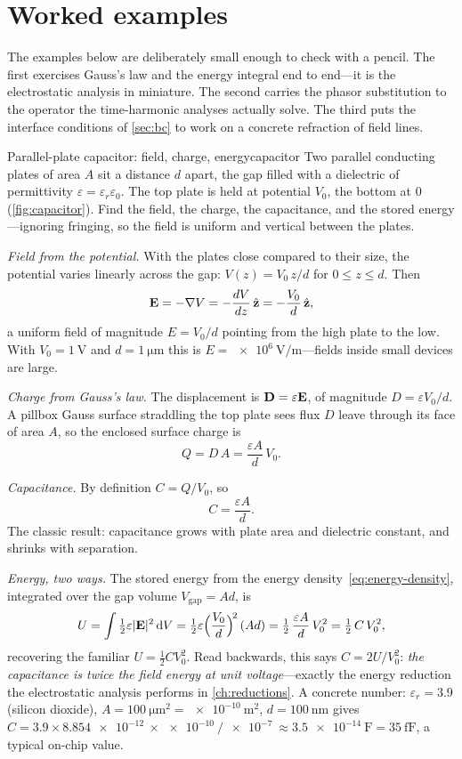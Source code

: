 \section{Worked examples}

The examples below are deliberately small enough to check with a pencil. The
first exercises Gauss's law and the energy integral end to end---it is the
electrostatic analysis in miniature. The second carries the phasor substitution
to the operator the time-harmonic analyses actually solve. The third puts the
interface conditions of \cref{sec:bc} to work on a concrete refraction of field
lines.

\begin{workedexample}{Parallel-plate capacitor: field, charge, energy}{capacitor}
Two parallel conducting plates of area $A$ sit a distance $d$ apart, the gap
filled with a dielectric of permittivity $\varepsilon=\varepsilon_r\varepsilon_0$.
The top plate is held at potential $V_0$, the bottom at $0$ (\cref{fig:capacitor}).
Find the field, the charge, the capacitance, and the stored energy---ignoring
fringing, so the field is uniform and vertical between the plates.

\emph{Field from the potential.} With the plates close compared to their size,
the potential varies linearly across the gap: $V(z)=V_0\,z/d$ for $0\le z\le
d$. Then
\[
  \mathbf{E} = -\nabla V = -\frac{dV}{dz}\,\hat{\mathbf{z}} = -\frac{V_0}{d}\,\hat{\mathbf{z}},
\]
a uniform field of magnitude $E=V_0/d$ pointing from the high plate to the low.
With $V_0=\SI{1}{\volt}$ and $d=\SI{1}{\micro\meter}$ this is
$E=\SI{e6}{\volt\per\meter}$---fields inside small devices are large.

\emph{Charge from Gauss's law.} The displacement is $\mathbf{D}=\varepsilon\mathbf{E}$, of
magnitude $D=\varepsilon V_0/d$. A pillbox Gauss surface straddling the top
plate sees flux $D$ leave through its face of area $A$, so the enclosed surface
charge is
\[
  Q = D\,A = \frac{\varepsilon A}{d}\,V_0.
\]

\emph{Capacitance.} By definition $C=Q/V_0$, so
\begin{equation}
  C = \frac{\varepsilon A}{d}. \label{eq:cap}
\end{equation}
The classic result: capacitance grows with plate area and dielectric constant,
and shrinks with separation.

\emph{Energy, two ways.} The stored energy from the energy
density~\eqref{eq:energy-density}, integrated over the gap volume $V_{\text{gap}}=Ad$,
is
\[
  U = \int \tfrac12\varepsilon\lvert\mathbf{E}\rvert^2\,\mathrm{d}V
    = \tfrac12\varepsilon\Big(\frac{V_0}{d}\Big)^{\!2}\,(Ad)
    = \tfrac12\,\frac{\varepsilon A}{d}\,V_0^2
    = \tfrac12\,C\,V_0^2,
\]
recovering the familiar $U=\tfrac12 C V_0^2$. Read backwards, this says
$C=2U/V_0^2$: \emph{the capacitance is twice the field energy at unit
voltage}---exactly the energy reduction the electrostatic analysis performs in
\cref{ch:reductions}. A concrete number: $\varepsilon_r=3.9$ (silicon dioxide),
$A=\SI{100}{\micro\meter\squared}=\SI{e-10}{\meter\squared}$,
$d=\SI{100}{\nano\meter}$ gives
$C=3.9\times\SI{8.854e-12}{}\times\SI{e-10}{}/\SI{e-7}{}\approx\SI{3.5e-14}{\farad}=\SI{35}{\femto\farad}$,
a typical on-chip value.
\end{workedexample}

